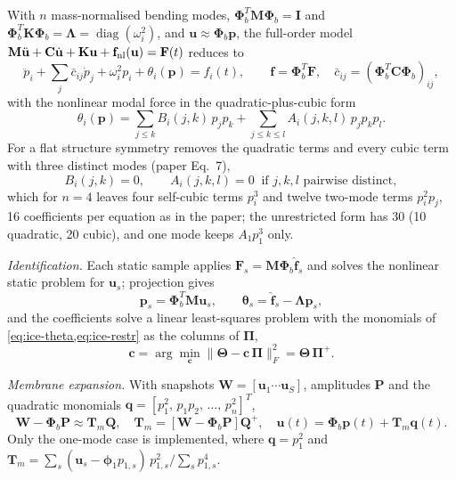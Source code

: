 With $n$ mass-normalised bending modes, $\boldsymbol\Phi_b^{T}\mathbf M\boldsymbol\Phi_b=\mathbf I$ and $\boldsymbol\Phi_b^{T}\mathbf K\boldsymbol\Phi_b=\boldsymbol\Lambda=\operatorname{diag}(\omega_i^2)$, and $\mathbf u\approx\boldsymbol\Phi_b\mathbf p$, the full-order model $\mathbf M\ddot{\mathbf u}+\mathbf C\dot{\mathbf u}+\mathbf K\mathbf u+\mathbf f_{\rm nl}(\mathbf u)=\mathbf F(t)$ reduces to
\begin{equation}\label{eq:ice-rom}
\ddot p_i+\sum_j\bar c_{ij}\dot p_j+\omega_i^2p_i+\theta_i(\mathbf p)=f_i(t),\qquad\mathbf f=\boldsymbol\Phi_b^{T}\mathbf F,\quad\bar c_{ij}=(\boldsymbol\Phi_b^{T}\mathbf C\boldsymbol\Phi_b)_{ij},
\end{equation}
with the nonlinear modal force in the quadratic-plus-cubic form
\begin{equation}\label{eq:ice-theta}
\theta_i(\mathbf p)=\sum_{j\le k}B_i(j,k)\,p_jp_k+\sum_{j\le k\le l}A_i(j,k,l)\,p_jp_kp_l .
\end{equation}
For a flat structure symmetry removes the quadratic terms and every cubic term with three distinct modes (paper Eq.~7),
\begin{equation}\label{eq:ice-restr}
B_i(j,k)=0,\qquad A_i(j,k,l)=0\ \text{ if $j,k,l$ pairwise distinct},
\end{equation}
which for $n=4$ leaves four self-cubic terms $p_i^3$ and twelve two-mode terms $p_i^2p_j$, 16 coefficients per equation as in the paper; the unrestricted form has 30 (10 quadratic, 20 cubic), and one mode keeps $A_1p_1^3$ only.

\emph{Identification.} Each static sample applies $\mathbf F_s=\mathbf M\boldsymbol\Phi_b\hat{\mathbf f}_s$ and solves the nonlinear static problem for $\mathbf u_s$; projection gives
\begin{equation}\label{eq:ice-id}
\mathbf p_s=\boldsymbol\Phi_b^{T}\mathbf M\mathbf u_s,\qquad\boldsymbol\theta_s=\hat{\mathbf f}_s-\boldsymbol\Lambda\mathbf p_s,
\end{equation}
and the coefficients solve a linear least-squares problem with the monomials of \cref{eq:ice-theta,eq:ice-restr} as the columns of $\boldsymbol\Pi$,
\begin{equation}\label{eq:ice-ls}
\mathbf c=\arg\min_{\mathbf c}\lVert\boldsymbol\Theta-\mathbf c\,\boldsymbol\Pi\rVert_F^2=\boldsymbol\Theta\,\boldsymbol\Pi^{+}.
\end{equation}

\emph{Membrane expansion.} With snapshots $\mathbf W=[\mathbf u_1\cdots\mathbf u_S]$, amplitudes $\mathbf P$ and the quadratic monomials $\mathbf q=[p_1^2,\,p_1p_2,\,\dots,\,p_n^2]^{T}$,
\begin{equation}\label{eq:ice-exp}
\mathbf W-\boldsymbol\Phi_b\mathbf P\approx\mathbf T_m\mathbf Q,\quad\mathbf T_m=[\mathbf W-\boldsymbol\Phi_b\mathbf P]\mathbf Q^{+},\quad\mathbf u(t)=\boldsymbol\Phi_b\mathbf p(t)+\mathbf T_m\mathbf q(t).
\end{equation}
Only the one-mode case is implemented, where $\mathbf q=p_1^2$ and $\mathbf T_m=\sum_s(\mathbf u_s-\boldsymbol\phi_1p_{1,s})\,p_{1,s}^2\big/\sum_sp_{1,s}^4$.

